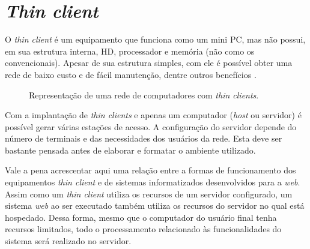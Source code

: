 \section{\textit{Thin client}}

O \textit{thin client} é um equipamento que funciona como um mini PC, mas não possui, em sua estrutura interna, HD, processador e memória (não como os convencionais). Apesar de sua estrutura simples, com ele é possível obter uma rede de baixo custo e de fácil manutenção, dentre outros benefícios \cite{THINCLIENT}.

\begin{figure}[ht]
    \centering
    \caption{Representação de uma rede de computadores com \textit{thin clients}.}
\end{figure}

Com a implantação de \textit{thin clients} e apenas um computador (\textit{host} ou servidor) é possível gerar várias estações de acesso. A configuração do servidor depende do número de terminais e das necessidades dos usuários da rede. Esta deve ser bastante pensada antes de elaborar e formatar o ambiente utilizado.

Vale a pena acrescentar aqui uma relação entre a formas de funcionamento dos equipamentos \textit{thin client} e de sistemas informatizados desenvolvidos para a \textit{web}. Assim como um \textit{thin client} utiliza os recursos de um servidor configurado, um sistema \textit{web} ao ser executado também utiliza os recursos do servidor no qual está hospedado. Dessa forma, mesmo que o computador do usuário final tenha recursos limitados, todo o processamento relacionado às funcionalidades do sistema será realizado no servidor.

